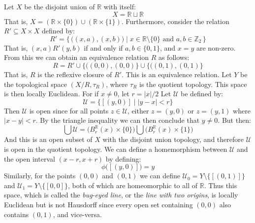     \begin{example}
        Let $X$ be the disjoint union of $\mathbb{R}$ with itself:
        \begin{equation}
            X=\mathbb{R}\sqcup\mathbb{R}
        \end{equation}
        That is, $X=(\mathbb{R}\times\{0\})\cup(\mathbb{R}\times\{1\})$.
        Furthermore, consider the relation $R'\subseteq{X}\times{X}$ defined by:
        \begin{equation}
            R'=\Big\{\,\Big((x,a),(x,b)\Big)\;\Big|\;
                x\in\mathbb{R}\setminus\{0\}
                \textrm{ and }a,b\in\mathbb{Z}_{2}\,\Big\}
        \end{equation}
        That is, $(x,a)R'(y,b)$ if and only if $a,b\in\{0,1\}$, and $x=y$ are
        non-zero. From this we can obtain an equivalence relation $R$ as
        follows:
        \begin{equation}
            R=R'\cup\big\{\big((0,0),(0,0)\big\}\cup
                \big\{\big((0,1),(0,1)\big\}
        \end{equation}
        That is, $R$ is the reflexive closure of $R'$. This is an equivalence
        relation. Let $Y$ be the topological space $(X/R,\tau_{R})$, where
        $\tau_{R}$ is the quotient topology. This space is then locally
        Euclidean. For if $x\ne{0}$, let $r=|x|/2$ Let $\mathcal{U}$ be defined
        by:
        \begin{equation}
            \mathcal{U}=\big\{[(y,0)]\;|\;|y-x|<r\big\}
        \end{equation}
        Then $\mathcal{U}$ is open since for all points $z\in\mathcal{U}$,
        either $z=(y,0)$ or $z=(y,1)$ where $|x-y|<r$. By the triangle
        inequality we can then conclude that $y\ne{0}$. But then:
        \begin{equation}
            \bigcup\mathcal{U}=\Big(B_{r}^{\mathbb{R}}(x)\times\{0\}\Big)
                \bigcup\Big(B_{r}^{\mathbb{R}}(x)\times\{1\}\Big)
        \end{equation}
        And this is an open subset of $X$ with the disjoint union topology, and
        therefore $\mathcal{U}$ is open in the quotient topology. We can define
        a homemorphism between $\mathcal{U}$ and the open interval $(x-r,x+r)$
        by defining:
        \begin{equation}
            \phi\big([(y,0)]\big)=y
        \end{equation}
        Similarly, for the points $(0,0)$ and $(0,1)$ we can define
        $\mathcal{U}_{0}=Y\setminus\{[(0,1)]\}$ and
        $\mathcal{U}_{1}=Y\setminus\{[0,0]\}$, both of which are homeomorphic
        to all of $\mathbb{R}$. Thus this space, which is called the
        \textit{bug-eyed line}, or the
        \textit{line with two origins}, is locally
        Euclidean but is not Hausdorff since every open set containing
        $(0,0)$ also contains $(0,1)$, and vice-versa.
    \end{example}
